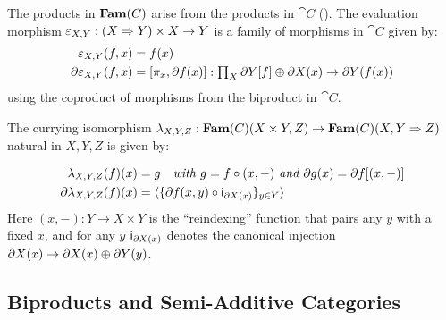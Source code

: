 The products in $\mathbf{Fam}(C)$ arise from the products in $\cat{C}$ ().
The evaluation morphism $\varepsilon_{X,Y}: (X \Rightarrow Y) \times X \to Y$ is a family of morphisms in
$\cat{C}$ given by:
\begin{align*}
\varepsilon_{X,Y}(f,x) &= f(x) \\
\partial\varepsilon_{X,Y}(f,x) &= [\pi_x, \partial f(x)]
  : \textstyle\prod_{X}\partial Y[f] \oplus \partial X(x) \to \partial Y(f(x))
\end{align*}
\noindent using the coproduct of morphisms from the biproduct in $\cat{C}$.

The currying isomorphism $\lambda_{X,Y,Z}: {\mathbf{Fam}(C)}(X \times Y,Z) \to
{\mathbf{Fam}(C)}(X,Y \Rightarrow Z)$ natural in $X, Y, Z$ is given by:

\vspace{-4mm}
\begin{align*}
\lambda_{X,Y,Z}(f)(x) &= g \quad\textit{with $g = f \circ (x,-)$ and $\partial g(x) = \partial f[(x,-)]$} \\
\partial\lambda_{X,Y,Z}(f)(x) &= \langle \{\partial f(x,y) \circ \mathsf{i}_{\partial X(x)}\}_{y \in Y}\rangle
\end{align*}
\noindent Here $(x,-): Y \to X \times Y$ is the ``reindexing'' function that pairs any $y$ with a fixed $x$,
and for any $y$ $\mathsf{i}_{\partial X(x)}$ denotes the canonical injection $\partial X(x) \to \partial X(x)
\oplus \partial Y(y)$.


\subsection{Biproducts and Semi-Additive Categories}
\label{sec:biproducts}

